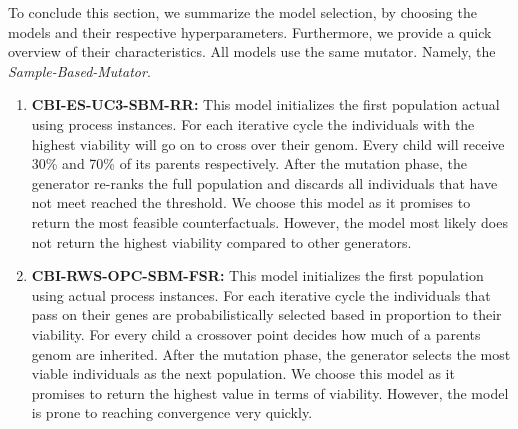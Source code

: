 \documentclass[./../../paper.tex]{subfiles}
\begin{document}
To conclude this section, we summarize the model selection, by choosing the models and their respective hyperparameters. Furthermore, we provide a quick overview of their characteristics. All models use the same mutator. Namely, the \emph{Sample-Based-Mutator}. 


\begin{enumerate}
    \item \textbf{CBI-ES-UC3-SBM-RR:} This model initializes the first population actual using process instances. For each iterative cycle the individuals with the highest viability will go on to cross over their genom. Every child will receive 30\% and 70\% of its parents respectively. After the mutation phase, the generator re-ranks the full population and discards all individuals that have not meet reached the threshold. We choose this model as it promises to return the most feasible counterfactuals. However, the model most likely does not return the highest viability compared to other generators.
    \item \textbf{CBI-RWS-OPC-SBM-FSR:} This model initializes the first population using actual process instances. For each iterative cycle the individuals that pass on their genes are probabilistically selected based in proportion to their viability. For every child a crossover point decides how much of a parents genom are inherited. After the mutation phase, the generator selects the most viable individuals as the next population. We choose this model as it promises to return the highest value in terms of viability. However, the model is prone to reaching convergence very quickly.  
\end{enumerate}

\end{document}
